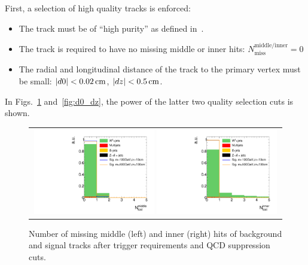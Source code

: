 First, a selection of high quality tracks is enforced:
\begin{itemize}
\renewcommand{\labelitemi}{\footnotesize{\ding{118}}}
\item The track must be of ``high purity'' as defined in~\cite{bib:CMS:Tracking_2010}.
\item The track is required to have no missing middle or inner hits: $N_{\text{miss}}^{\text{middle/inner}}=0$
\item The radial and longitudinal  distance of the track to the primary vertex must be small: \mbox{$|d0|<0.02\,\text{cm}$}, \mbox{$|dz|<0.5\,\text{cm}$}.
\end{itemize}
In Figs.~\ref{fig:LostHits} and~\ref{fig:d0_dz}, the power of the latter two quality selection cuts is shown.\\
\begin{figure}[!b]
  \centering 
  \begin{tabular}{c}
    \includegraphics[width=0.49\textwidth]{figures/analysis/AnalysisSelection/chiTracksQCDsupressionTrigger_2Signals_FullBkg/htrackNLostMid_lin.pdf}
    \includegraphics[width=0.49\textwidth]{figures/analysis/AnalysisSelection/chiTracksQCDsupressionTrigger_2Signals_FullBkg/htrackNLostInner_lin.pdf}
  \end{tabular}
  \caption{Number of missing middle (left) and inner (right) hits of background and signal tracks after trigger requirements and QCD suppression cuts.}
  \label{fig:LostHits}
\end{figure}
